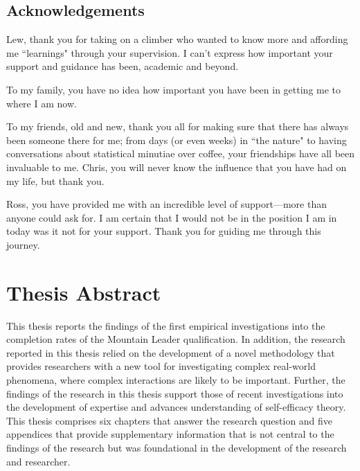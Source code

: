 \documentclass[
  12pt,
  a4paper,
]{book}
\begin{document}
\section*{Acknowledgements}

Lew, thank you for taking on a climber who wanted to know more and affording me ``learnings" through your supervision. I can't express how important your support and guidance has been, academic and beyond.

To my family, you have no idea how important you have been in getting me to where I am now. 

To my friends, old and new, thank you all for making sure that there has always been someone there for me; from days (or even weeks) in ``the nature" to having conversations about statistical minutiae over coffee, your friendships have all been invaluable to me. Chris, you will never know the influence that you have had on my life, but thank you.

Ross, you have provided me with an incredible level of support---more than anyone could ask for. I am certain that I would not be in the position I am in today was it not for your support. Thank you for guiding me through this journey.

{
\setcounter{tocdepth}{2}
\tableofcontents
}
\listoftables
{}

\listoffigures
{}

\mainmatter
\setcounter{page}{1}

\hypertarget{thesis-abstract}{%
\chapter*{Thesis Abstract}\label{thesis-abstract}}

This thesis reports the findings of the first empirical investigations into the completion rates of the Mountain Leader qualification. In addition, the research reported in this thesis relied on the development of a novel methodology that provides researchers with a new tool for investigating complex real-world phenomena, where complex interactions are likely to be important. Further, the findings of the research in this thesis support those of recent investigations into the development of expertise and advances understanding of self-efficacy theory. This thesis comprises six chapters that answer the research question and five appendices that provide supplementary information that is not central to the findings of the research but was foundational in the development of the research and researcher.
\end{document}
